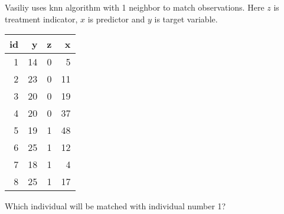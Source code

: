 
\begin{question}
Vasiliy uses knn algorithm with 1 neighbor to match observations.
Here \(z\) is treatment indicator, \(x\) is predictor and \(y\) is target variable.

\begin{longtable}[]{@{}rrrr@{}}
\toprule()
id & y & z & x \\
\midrule()
\endhead
1 & 14 & 0 & 5 \\
2 & 23 & 0 & 11 \\
3 & 20 & 0 & 19 \\
4 & 20 & 0 & 37 \\
5 & 19 & 1 & 48 \\
6 & 25 & 1 & 12 \\
7 & 18 & 1 & 4 \\
8 & 25 & 1 & 17 \\
\bottomrule()
\end{longtable}

Which individual will be matched with individual number 1?
\end{question}


